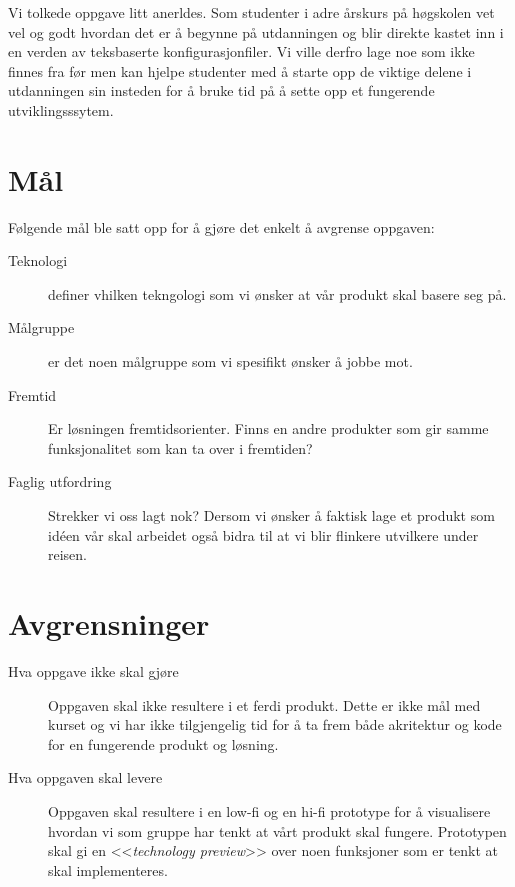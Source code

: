 Vi tolkede oppgave litt anerldes. Som studenter i adre årskurs på høgskolen vet vel og godt hvordan det er å begynne på utdanningen og blir direkte kastet inn i en verden av teksbaserte konfigurasjonfiler. Vi ville derfro lage noe som ikke finnes fra før men kan hjelpe studenter med å starte opp de viktige delene i utdanningen sin insteden for å bruke tid på å sette opp et fungerende utviklingsssytem. 

\section{Mål}
Følgende mål ble satt opp for å gjøre det enkelt å avgrense oppgaven:
\begin{description}
\item[Teknologi] definer vhilken tekngologi som vi ønsker at vår produkt skal basere seg på.
\item[Målgruppe] er det noen målgruppe som vi spesifikt ønsker å jobbe mot.
\item[Fremtid] Er løsningen fremtidsorienter. Finns en andre produkter som gir samme funksjonalitet som kan ta over i fremtiden?
\item[Faglig utfordring] Strekker vi oss lagt nok? Dersom vi ønsker å faktisk lage et produkt som idéen vår skal arbeidet også bidra til at vi blir flinkere utvilkere under reisen.

\end{description}

\section{Avgrensninger}
\begin{description}
\item[Hva oppgave ikke skal gjøre]
Oppgaven skal ikke resultere i et ferdi produkt. Dette er ikke mål med kurset og vi har ikke tilgjengelig tid for å ta frem både akritektur og kode for en fungerende produkt og løsning.
\item[Hva oppgaven skal levere]
Oppgaven skal resultere i en low-fi og en hi-fi prototype for å visualisere hvordan vi som gruppe har tenkt at vårt produkt skal fungere. Prototypen skal gi en <<\textit{technology preview}>> over noen funksjoner som er tenkt at skal implementeres.
\end{description}

